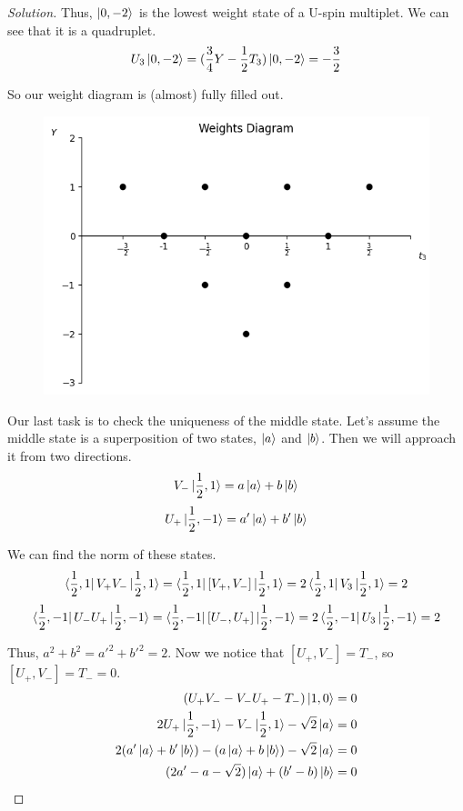 \documentclass[12pt]{article}
\newenvironment{solution}{\begin{proof}[Solution]}{\end{proof}}
\begin{document}
\begin{solution}
Thus, $\ket{0,-2}$ is the lowest weight state of a U-spin multiplet. We can see that it is a quadruplet.
\begin{equation*}
    U_3\ket{0,-2}=(\frac{3}{4}Y-\frac{1}{2}T_3)\ket{0,-2}=-\frac{3}{2}
\end{equation*}

So our weight diagram is (almost) fully filled out.

\begin{figure}[h!]
    \centering
    \includegraphics[width=0.5\linewidth]{weights_diagram2.png}
\end{figure}

\newpage

Our last task is to check the uniqueness of the middle state. Let's assume the middle state is a superposition of two states, $\ket{a}$ and $\ket{b}$. Then we will approach it from two directions.
\begin{equation*}
    V_-\ket{\frac{1}{2},1}=a\ket{a}+b\ket{b}
\end{equation*}
\begin{equation*}
    U_+\ket{\frac{1}{2},-1}=a'\ket{a}+b'\ket{b}
\end{equation*}

We can find the norm of these states.
\begin{equation*}
    \bra{\frac{1}{2},1}V_+V_-\ket{\frac{1}{2},1}=\bra{\frac{1}{2},1}[V_+,V_-]\ket{\frac{1}{2},1}=2\bra{\frac{1}{2},1}V_3\ket{\frac{1}{2},1}=2
\end{equation*}
\begin{equation*}
    \bra{\frac{1}{2},-1}U_-U_+\ket{\frac{1}{2},-1}=\bra{\frac{1}{2},-1}[U_-,U_+]\ket{\frac{1}{2},-1}=2\bra{\frac{1}{2},-1}U_3\ket{\frac{1}{2},-1}=2
\end{equation*}

Thus, $a^2+b^2=a'^2+b'^2=2$. Now we notice that $[U_+,V_-]=T_-$, so $[U_+,V_-]=T_-=0$.
\begin{align*}
    (U_+V_--V_-U_+-T_-)\ket{1,0}=0 \\
    2U_+\ket{\frac{1}{2},-1}-V_-\ket{\frac{1}{2},1}-\sqrt{2}\ket{a}=0 \\
    2 (a'\ket{a}+b'\ket{b})-(a\ket{a}+b\ket{b})-\sqrt{2}\ket{a}=0 \\
    (2a'-a-\sqrt{2})\ket{a}+(b'-b)\ket{b}=0
\end{align*}


\end{solution}
\end{document}
